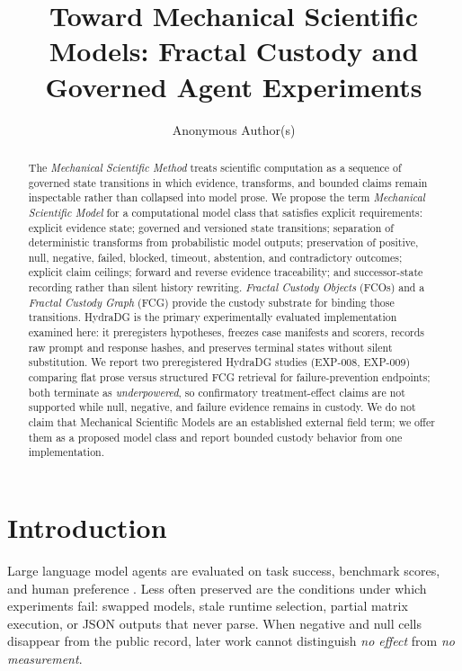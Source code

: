 \documentclass{article}
\title{Toward Mechanical Scientific Models: Fractal Custody and Governed Agent Experiments}
\author{Anonymous Author(s)}
\begin{document}
\maketitle

\begin{abstract}
The \emph{Mechanical Scientific Method} treats scientific computation as a sequence of governed state transitions in which evidence, transforms, and bounded claims remain inspectable rather than collapsed into model prose.
We propose the term \emph{Mechanical Scientific Model} for a computational model class that satisfies explicit requirements: explicit evidence state; governed and versioned state transitions; separation of deterministic transforms from probabilistic model outputs; preservation of positive, null, negative, failed, blocked, timeout, abstention, and contradictory outcomes; explicit claim ceilings; forward and reverse evidence traceability; and successor-state recording rather than silent history rewriting.
\emph{Fractal Custody Objects} (FCOs) and a \emph{Fractal Custody Graph} (FCG) provide the custody substrate for binding those transitions.
HydraDG is the primary experimentally evaluated implementation examined here: it preregisters hypotheses, freezes case manifests and scorers, records raw prompt and response hashes, and preserves terminal states without silent substitution.
We report two preregistered HydraDG studies (EXP-008, EXP-009) comparing flat prose versus structured FCG retrieval for failure-prevention endpoints; both terminate as \emph{underpowered}, so confirmatory treatment-effect claims are not supported while null, negative, and failure evidence remains in custody.
We do not claim that Mechanical Scientific Models are an established external field term; we offer them as a proposed model class and report bounded custody behavior from one implementation.
\end{abstract}

\section{Introduction}

Large language model agents are evaluated on task success, benchmark scores, and human preference \cite{liu2023agentbench,zhou2023webarena}.
Less often preserved are the conditions under which experiments fail: swapped models, stale runtime selection, partial matrix execution, or JSON outputs that never parse.
When negative and null cells disappear from the public record, later work cannot distinguish \emph{no effect} from \emph{no measurement}.
\end{document}
